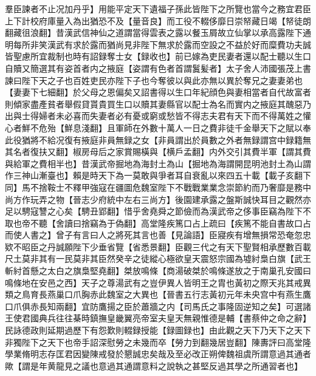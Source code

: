 羣臣諫者不止况加丹乎】用能平定天下遺福子孫此皆陛下之所覽也當今之務宜君臣上下計校府庫量入為出猶恐不及【量音良】而工役不輟侈靡日崇帑藏日竭【帑徒朗翻藏徂浪翻】昔漢武信神仙之道謂當得雲表之露以餐玉屑故立仙掌以承高露陛下通明每所非笑漢武有求於露而猶尚見非陛下無求於露而空設之不益於好而糜費功夫誠皆聖慮所宜裁制也時有詔録奪士女【録收也】前已嫁為吏民妻者還以配士聽以生口自贖又簡選其有姿首者内之掖庭【姿謂有色者首謂鬒髪者】太子舍人沛國張茂上書諫曰陛下天之子也百姓吏民亦陛下子也今奪彼以與此亦無以異於奪兄之妻妻弟也【妻妻下七細翻】於父母之恩偏矣又詔書得以生口年紀顔色與妻相當者自代故富者則傾家盡產貧者舉假貸貰貴買生口以贖其妻縣官以配士為名而實内之掖庭其醜惡乃出與士得婦者未必喜而失妻者必有憂或窮或愁皆不得志夫君有天下而不得萬姓之懽心者鮮不危殆【鮮息淺翻】且軍師在外數十萬人一日之費非徒千金舉天下之賦以奉此役猶將不給况復有掖庭非員無録之女【非員謂出於員數之外者無録謂宫中録籍無其名者復扶又翻】椒房母后之家賞賜橫與【横戶孟翻】内外交引其費半軍【謂其費與給軍之費相半也】昔漢武帝掘地為海封土為山【掘地為海謂開昆明池封土為山謂作三神山漸臺也】賴是時天下為一莫敢與爭者耳自衰亂以來四五十載【載子亥翻下同】馬不捨鞍士不釋甲強寇在疆圖危魏室陛下不戰戰業業念崇節約而乃奢靡是務中尚方作玩弄之物【晉志少府統中左右三尚方】後園建承露之盤斯誠快耳目之觀然亦足以騁寇讐之心矣【騁丑郢翻】惜乎舍堯舜之節儉而為漢武帝之侈事臣竊為陛下不取也帝不聽【舍讀曰捨竊為于偽翻】高堂隆疾篤口占上疏曰【疾篤不能自書故口占而使人書之】曾子有言曰人之將死其言也善【見論語】臣寢疾有增無損常恐奄忽忠欵不昭臣之丹誠願陛下少垂省覽【省悉景翻】臣觀三代之有天下聖賢相承歷數百載尺土莫非其有一民莫非其臣然癸辛之徒縱心極欲皇天震怒宗國為墟紂梟白旗【武王斬紂首懸之太白之旗梟堅堯翻】桀放鳴條【商湯破桀於鳴條遂放之于南巢孔安國曰鳴條地在安邑之西】天子之尊湯武有之豈伊異人皆明王之胄也黃初之際天兆其戒異類之鳥育長燕巢口爪胸赤此魏室之大異也【晉書五行志黃初元年未央宫中有燕生鷹口爪俱赤長知兩翻】宜防鷹揚之臣於蕭牆之内【司馬氏之事隆固逆知之矣】可選諸王使君國典兵往往棊時鎮撫皇畿翼亮帝室夫皇天無親惟德是輔【書蔡仲之命之辭】民詠德政則延期過歷下有怨歎則輟録授能【録圖録也】由此觀之天下乃天下之天下非獨陛下之天下也帝手詔深慰勞之未幾而卒【勞力到翻幾居豈翻】陳夀評曰高堂隆學業脩明志存匡君因變陳戒發於懇誠忠矣哉及至必改正朔俾魏祖虞所謂意過其通者歟【謂是年黄龍見之議也意過其通謂意料之說執之甚堅反過其學之所通習者也】

